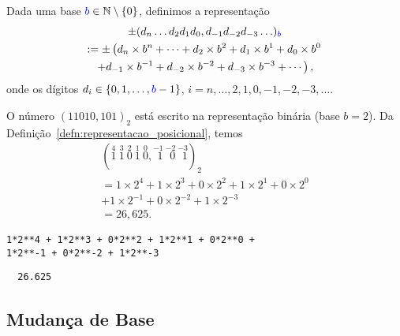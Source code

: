 \begin{defn}\label{defn:representacao_posicional}
  Dada uma base ${\color{blue}b}\in\mathbb{N}\setminus \{0\}$, definimos a representação
  \begin{gather}
    \pm (d_n\ldots d_2d_1d_0,d_{-1}d_{-2}d_{-3}\ldots)_{\color{blue}b} \\
    := \pm \left(d_n\times b^n + \cdots + d_2\times b^2 + d_1\times b^1 + d_0\times b^0\right. \\
      \left. + d_{-1}\times b^{-1} + d_{-2}\times b^{-2} + d_{-3}\times b^{-3} + \cdots\right),
  \end{gather}
onde os dígitos $d_i\in\{0, 1, \dotsc, {\color{blue}b}-1\}$, $i=n, \dotsc, 2, 1, 0, -1, -2, -3, \ldots$.
\end{defn}

\begin{ex}\label{ex:base_binaria}
  O número $(11010,101)_2$ está escrito na representação binária (base $b=2$). Da Definição~\ref{defn:representacao_posicional}, temos
  \begin{gather}
    (\stackrel{4}{1}~\stackrel{3}{1}~\stackrel{2}{0}~\stackrel{1}{1}~\stackrel{0}{0},\stackrel{-1}{~\,1}~\stackrel{-2}{~\,0}~\stackrel{-3}{~\,1})_2\\
    = 1\times 2^4 + 1\times 2^3 + 0\times 2^2 + 1\times 2^1 + 0\times 2^0\\
    + 1\times 2^{-1} + 0\times 2^{-2} + 1\times 2^{-3}\\
    = 26,625.
  \end{gather}

\begin{lstlisting}
1*2**4 + 1*2**3 + 0*2**2 + 1*2**1 + 0*2**0 +
1*2**-1 + 0*2**-2 + 1*2**-3
\end{lstlisting}

\begin{verbatim}
  26.625
\end{verbatim}
\end{ex}

\subsection{Mudança de Base}

